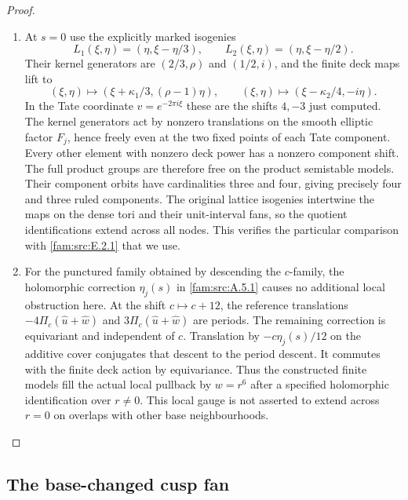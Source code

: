 \begin{proof}
\begin{enumerate}[label=\arabic*.,leftmargin=*]
\item At $s=0$ use the explicitly marked isogenies
\[
 L_1(\xi,\eta)=(\eta,\xi-\eta/3),\qquad
 L_2(\xi,\eta)=(\eta,\xi-\eta/2).
\]
Their kernel generators are $(2/3,\rho)$ and $(1/2,i)$,
and the finite deck maps lift to
\[
 (\xi,\eta)\mapsto(\xi+\kappa_1/3,(\rho-1)\eta),
 \qquad
 (\xi,\eta)\mapsto(\xi-\kappa_2/4,-i\eta).
\]
In the Tate coordinate $v=e^{-2\pi i\xi}$ these are the
shifts $4,-3$ just computed. The kernel generators act
by nonzero translations on the smooth elliptic factor
$F_j$, hence freely even at the two fixed points of each
Tate component. Every other element with nonzero deck
power has a nonzero component shift. The full product
groups are therefore free on the product semistable
models. Their component orbits have cardinalities three
and four, giving precisely four and three ruled
components. The original lattice isogenies intertwine
the maps on the dense tori and their unit-interval fans,
so the quotient identifications extend across all nodes.
This verifies the particular comparison with \cref{fam:src:E.2.1} that
we use.

\item For the punctured family obtained by descending the
$c$-family, the holomorphic correction $\eta_j(s)$ in
\cref{fam:src:A.5.1} causes no additional local obstruction here. At the
shift $c\mapsto c+12$, the reference translations
$-4\Pi_c(\widehat u+\widehat w)$ and
$3\Pi_c(\widehat u+\widehat w)$ are periods.
The remaining correction is equivariant and independent
of $c$. Translation by $-c\eta_j(s)/12$ on the additive
cover conjugates that descent to the period descent.
It commutes with the finite deck action by equivariance.
Thus the constructed finite models fill the actual local
pullback by $w=r^6$ after a specified holomorphic
identification over $r\ne0$. This local gauge is not
asserted to extend across $r=0$ on overlaps with other
base neighbourhoods.
\end{enumerate}
\end{proof}

\subsection{The base-changed cusp fan}\label{push:section:B.2}

